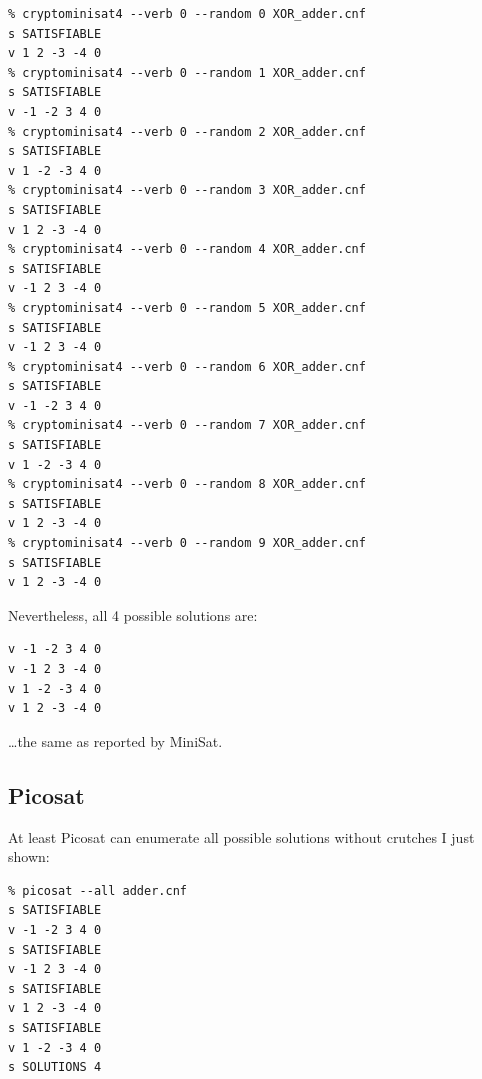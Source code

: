 \begin{lstlisting}
% cryptominisat4 --verb 0 --random 0 XOR_adder.cnf
s SATISFIABLE
v 1 2 -3 -4 0
% cryptominisat4 --verb 0 --random 1 XOR_adder.cnf
s SATISFIABLE
v -1 -2 3 4 0
% cryptominisat4 --verb 0 --random 2 XOR_adder.cnf
s SATISFIABLE
v 1 -2 -3 4 0
% cryptominisat4 --verb 0 --random 3 XOR_adder.cnf
s SATISFIABLE
v 1 2 -3 -4 0
% cryptominisat4 --verb 0 --random 4 XOR_adder.cnf
s SATISFIABLE
v -1 2 3 -4 0
% cryptominisat4 --verb 0 --random 5 XOR_adder.cnf
s SATISFIABLE
v -1 2 3 -4 0
% cryptominisat4 --verb 0 --random 6 XOR_adder.cnf
s SATISFIABLE
v -1 -2 3 4 0
% cryptominisat4 --verb 0 --random 7 XOR_adder.cnf
s SATISFIABLE
v 1 -2 -3 4 0
% cryptominisat4 --verb 0 --random 8 XOR_adder.cnf
s SATISFIABLE
v 1 2 -3 -4 0
% cryptominisat4 --verb 0 --random 9 XOR_adder.cnf
s SATISFIABLE
v 1 2 -3 -4 0
\end{lstlisting}

Nevertheless, all 4 possible solutions are:

\begin{lstlisting}
v -1 -2 3 4 0
v -1 2 3 -4 0
v 1 -2 -3 4 0
v 1 2 -3 -4 0
\end{lstlisting}

\dots the same as reported by MiniSat.

\subsection{Picosat}

At least Picosat can enumerate all possible solutions without crutches I just shown:

\begin{lstlisting}
% picosat --all adder.cnf
s SATISFIABLE
v -1 -2 3 4 0
s SATISFIABLE
v -1 2 3 -4 0
s SATISFIABLE
v 1 2 -3 -4 0
s SATISFIABLE
v 1 -2 -3 4 0
s SOLUTIONS 4
\end{lstlisting}








